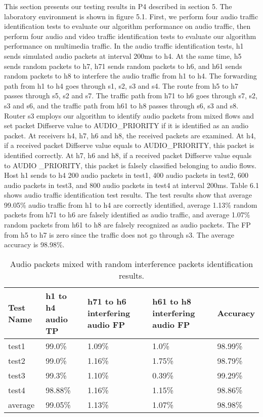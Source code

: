 \documentclass[master]{thesis}
\begin{document}
This section presents our testing results in P4 described in section 5. The laboratory environment is shown in figure 5.1. First, we perform four audio traffic identification tests to evaluate our algorithm performance on audio traffic, then perform four audio and video traffic identification tests to evaluate our algorithm performance on multimedia traffic. In the audio traffic identification tests, h1 sends simulated audio packets at interval 200ms to h4. At the same time, h5 sends random packets to h7, h71 sends random packets to h6, and h61 sends random packets to h8 to interfere the audio traffic from h1 to h4. The forwarding path from h1 to h4 goes through s1, s2, s3 and s4. The route from h5 to h7 passes through s5, s2 and s7. The traffic path from h71 to h6 goes through s7, s2, s3 and s6, and the traffic path from h61 to h8 passes through s6, s3 and s8. Router s3 employs our algorithm to identify audio packets from mixed flows and set packet Diffserve value to AUDIO\_PRIORITY if it is identified as an audio packet. At receivers h4, h7, h6 and h8, the received packets are examined. At h4, if a received packet Diffserve value equals to AUDIO\_PRIORITY, this packet is identified correctly. At h7, h6 and h8, if a received packet Diffserve value equals to AUDIO \_PRIORITY, this packet is falsely classified belonging to audio flows. Host h1 sends to h4 200 audio packets in test1, 400 audio packets in test2, 600 audio packets in test3, and 800 audio packets in test4 at interval 200ms. Table 6.1 shows audio traffic identification test results. The test results show that average 99.05\% audio traffic from h1 to h4 are correctly identified, average 1.13\% random packets from h71 to h6 are falsely identified as audio traffic, and average 1.07\% random packets from h61 to h8 are falsely recognized as audio packets. The FP from h5 to h7 is zero since the traffic does not go through s3. The average accuracy is 98.98\%. 

\begin{table}[hp]
    \caption[Audio packets mixed with random interference packets identification results.]{Audio packets mixed with random interference packets identification results.}
    \label{table:t61}
    
    \begin{center}
        \begin{tabular}{@{}*{5}{l}} %
            \toprule %
          Test Name	&h1 to h4 audio TP	&h71 to h6 interfering audio FP	&h61 to h8 interfering audio FP	&Accuracy  \\
            \midrule %
		test1	&99.0\%	&1.09\%	&1.0\%	&98.99\%  \\
		test2	&99.0\%	&1.16\%	&1.75\%	&98.79\% \\
		test3	&99.3\%	&1.10\%	&0.39\%	&99.29\% \\
		test4	&98.88\%	&1.16\%	&1.15\%	&98.86\% \\
		average	&99.05\%	&1.13\%	&1.07\%	&98.98\% \\
            \bottomrule %
        \end{tabular}
    \end{center}
\end{table}
\end{document}
